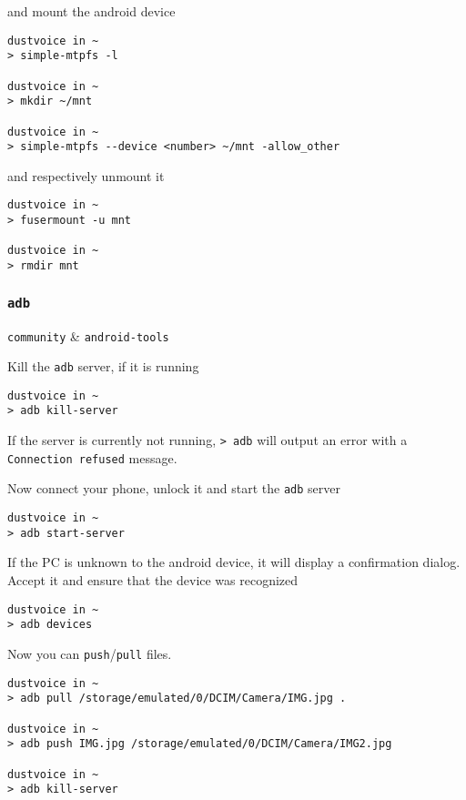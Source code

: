 \documentclass[10pt]{dustdoc}
\begin{document}
\noindent
and mount the android device

\begin{verbatim}
dustvoice in ~
> simple-mtpfs -l

dustvoice in ~
> mkdir ~/mnt

dustvoice in ~
> simple-mtpfs --device <number> ~/mnt -allow_other
\end{verbatim}


\noindent
and respectively unmount it

\begin{verbatim}
dustvoice in ~
> fusermount -u mnt

dustvoice in ~
> rmdir mnt
\end{verbatim}


\subsubsection{\texttt{adb}}%
\label{sec:adb}

\begin{pkgtable}
    \texttt{community} & \texttt{android-tools} \\
\end{pkgtable}

Kill the \texttt{adb} server, if it is running

\begin{verbatim}
dustvoice in ~
> adb kill-server
\end{verbatim}


\begin{NOTE}
    If the server is currently not running, \texttt{> adb} will output an error with a \texttt{Connection refused} message.
\end{NOTE}

Now connect your phone, unlock it and start the \texttt{adb} server

\begin{verbatim}
dustvoice in ~
> adb start-server
\end{verbatim}


If the PC is unknown to the android device, it will display a confirmation dialog.
Accept it and ensure that the device was recognized

\begin{verbatim}
dustvoice in ~
> adb devices
\end{verbatim}


Now you can \texttt{push}/\texttt{pull} files.

\begin{verbatim}
dustvoice in ~
> adb pull /storage/emulated/0/DCIM/Camera/IMG.jpg .

dustvoice in ~
> adb push IMG.jpg /storage/emulated/0/DCIM/Camera/IMG2.jpg

dustvoice in ~
> adb kill-server
\end{verbatim}
\end{document}
